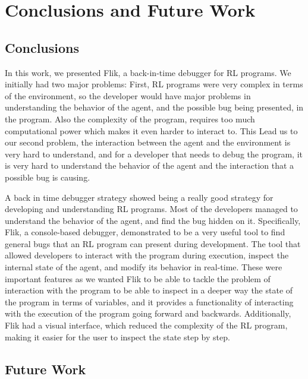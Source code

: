 
\chapter{Conclusions and Future Work}
\label{cha:con-fut}

\section{Conclusions}
\label{sec:conclusions}

In this work, we presented \ac{Flik}, a back-in-time debugger for \ac{RL} programs.
We initially had two major problems: First, \ac{RL} programs were very complex in terms of the environment,
so the developer would have major problems in understanding the behavior of the agent, and
the possible bug being presented, in the program. Also the complexity of the program, requires
too much computational power which makes it even harder to interact to. This Lead us to our second problem,
the interaction between the agent and the environment is very hard to understand, and
for a developer that needs to debug the program, it is very hard to understand the behavior of the agent
and the interaction that a possible bug is causing.

A back in time debugger strategy showed being a really good strategy for developing and 
understanding RL programs. Most of the developers managed to understand the behavior of the agent,
and find the bug hidden on it. Specifically, \ac{Flik}, a console-based debugger, demonstrated to 
be a very useful tool to find general bugs that an \ac{RL} program can present during development. 
The tool that allowed developers to interact with the program during 
execution, inspect the internal state of the agent, and modify its behavior in real-time. These were 
important features as we wanted \ac{Flik} to be able to tackle the problem of interaction with the 
program to be able to inspect in a deeper way the state of the program in terms of variables, and 
it provides a functionality of interacting with the execution of the program going forward and backwards.
Additionally, \ac{Flik} had a visual interface, which reduced the complexity of the \ac{RL} program,
making it easier for the user to inspect the state step by step.

\section{Future Work}
\label{sec:future-work}

